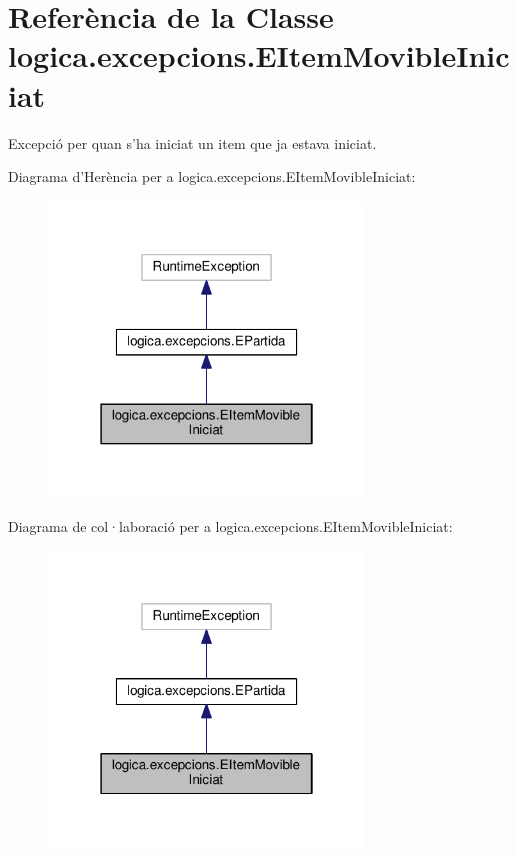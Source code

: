 \hypertarget{classlogica_1_1excepcions_1_1_e_item_movible_iniciat}{\section{Referència de la Classe logica.\+excepcions.\+E\+Item\+Movible\+Iniciat}
\label{classlogica_1_1excepcions_1_1_e_item_movible_iniciat}
}


Excepció per quan s'ha iniciat un item que ja estava iniciat.  




Diagrama d'Herència per a logica.\+excepcions.\+E\+Item\+Movible\+Iniciat\+:\nopagebreak
\begin{figure}[H]
\begin{center}
\leavevmode
\includegraphics[width=238pt]{classlogica_1_1excepcions_1_1_e_item_movible_iniciat__inherit__graph}
\end{center}
\end{figure}


Diagrama de col·laboració per a logica.\+excepcions.\+E\+Item\+Movible\+Iniciat\+:\nopagebreak
\begin{figure}[H]
\begin{center}
\leavevmode
\includegraphics[width=238pt]{classlogica_1_1excepcions_1_1_e_item_movible_iniciat__coll__graph}
\end{center}
\end{figure}
